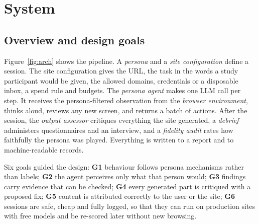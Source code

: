 \documentclass[10pt,twocolumn]{article}
\begin{document}
\section{System}
\label{sec:system}

\subsection{Overview and design goals}
\label{sec:overview}

Figure~\ref{fig:arch} shows the pipeline. A \emph{persona} and a \emph{site configuration} define a session. The site configuration gives the URL, the task in the words a study participant would be given, the allowed domains, credentials or a disposable inbox, a spend rule and budgets. The \emph{persona agent} makes one LLM call per step. It receives the persona-filtered observation from the \emph{browser environment}, thinks aloud, reviews any new screen, and returns a batch of actions. After the session, the \emph{output assessor} critiques everything the site generated, a \emph{debrief} administers questionnaires and an interview, and a \emph{fidelity audit} rates how faithfully the persona was played. Everything is written to a report and to machine-readable records.

Six goals guided the design: \textbf{G1} behaviour follows persona mechanisms rather than labels; \textbf{G2} the agent perceives only what that person would; \textbf{G3} findings carry evidence that can be checked; \textbf{G4} every generated part is critiqued with a proposed fix; \textbf{G5} content is attributed correctly to the user or the site; \textbf{G6} sessions are safe, cheap and fully logged, so that they can run on production sites with free models and be re-scored later without new browsing.
\end{document}
